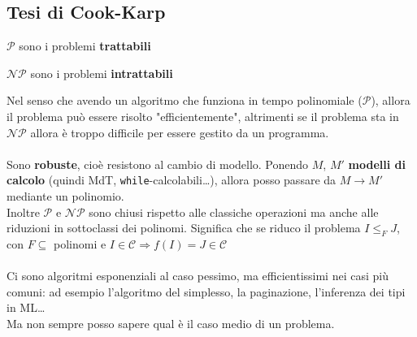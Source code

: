 \documentclass[10pt]{book}
\begin{document}
\subsection{Tesi di Cook-Karp}
\begin{list}{-}{}
	\item $\mathscr{P}$ sono i problemi \textbf{trattabili}
	\item $\mathscr{NP}$ sono i problemi \textbf{intrattabili}
\end{list}
Nel senso che avendo un algoritmo che funziona in tempo polinomiale ($\mathscr{P}$), allora il problema può essere risolto "efficientemente", altrimenti se il problema sta in $\mathscr{NP}$ allora è troppo difficile per essere gestito da un programma.\\\\
Sono \textbf{robuste}, cioè resistono al cambio di modello. Ponendo $M$, $M'$ \textbf{modelli di calcolo} (quindi MdT, \texttt{while}-calcolabili\ldots), allora posso passare da $M \longrightarrow M'$ mediante un polinomio.\\
Inoltre $\mathscr{P}$ e $\mathscr{NP}$ sono chiusi rispetto alle classiche operazioni ma anche alle riduzioni in sottoclassi dei polinomi. Significa che se riduco il problema $I \leq_F J$, con $F \subseteq$ polinomi e $I\in\mathscr{C} \Rightarrow f(I) = J \in\mathscr{C}$\\\\
Ci sono algoritmi esponenziali al caso pessimo, ma efficientissimi nei casi più comuni: ad esempio l'algoritmo del simplesso, la paginazione, l'inferenza dei tipi in ML\ldots\\
Ma non sempre posso sapere qual è il caso medio di un problema.
\end{document}

